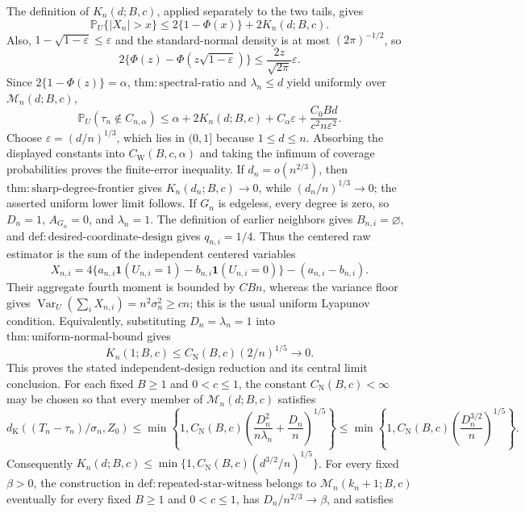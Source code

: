 The definition of \(K_n(d;B,c)\), applied separately to the two tails, gives
\[
 \mathbb P_U\{|X_n|>x\}\le2\{1-\Phi(x)\}+2K_n(d;B,c).
\]
Also, \(1-\sqrt{1-\varepsilon}\le\varepsilon\) and the standard-normal density is at most \((2\pi)^{-1/2}\), so
\[
 2\{\Phi(z)-\Phi(z\sqrt{1-\varepsilon})\}
 \le\frac{2z}{\sqrt{2\pi}}\varepsilon.
\]
Since \(2\{1-\Phi(z)\}=\alpha\), \(\mathrm{thm:spectral\text{-}ratio}\) and \(\lambda_n\le d\) yield uniformly over \(\mathcal M_n(d;B,c)\),
\[
 \mathbb P_U(\tau_n\notin C_{n,\alpha})
 \le\alpha+2K_n(d;B,c)+C_\alpha\varepsilon
 +\frac{C_0Bd}{c^2n\varepsilon^2}.
\]
Choose \(\varepsilon=(d/n)^{1/3}\), which lies in \((0,1]\) because \(1\le d\le n\).  Absorbing the displayed constants into \(C_{\mathrm W}(B,c,\alpha)\) and taking the infimum of coverage probabilities proves the finite-error inequality.  If \(d_n=o(n^{2/3})\), then \(\mathrm{thm:sharp\text{-}degree\text{-}frontier}\) gives \(K_n(d_n;B,c)\to0\), while \((d_n/n)^{1/3}\to0\); the asserted uniform lower limit follows.
If \(G_n\) is edgeless, every degree is zero, so \(D_n=1\), \(A_{G_n}=0\), and \(\lambda_n=1\).  The definition of earlier neighbors gives \(B_{n,i}=\varnothing\), and \(\mathrm{def:desired\text{-}coordinate\text{-}design}\) gives \(q_{n,i}=1/4\).  Thus the centered raw estimator is the sum of the independent centered variables
\[
 X_{n,i}=4\{a_{n,i}\mathbf1(U_{n,i}=1)-b_{n,i}\mathbf1(U_{n,i}=0)\}-(a_{n,i}-b_{n,i}).
\]
Their aggregate fourth moment is bounded by \(CBn\), whereas the variance floor gives \(\operatorname{Var}_U(\sum_iX_{n,i})=n^2\sigma_n^2\ge cn\); this is the usual uniform Lyapunov condition.  Equivalently, substituting \(D_n=\lambda_n=1\) into \(\mathrm{thm:uniform\text{-}normal\text{-}bound}\) gives
\[
 K_n(1;B,c)\le C_{\mathrm N}(B,c)(2/n)^{1/5}\longrightarrow0.
\]
This proves the stated independent-design reduction and its central limit conclusion.
For each fixed \(B\ge1\) and \(0<c\le1\), the constant \(C_{\mathrm N}(B,c)<\infty\) may be chosen so that every member of \(\mathcal M_n(d;B,c)\) satisfies
\[
d_{\mathrm K}((T_n-\tau_n)/\sigma_n,Z_0)\le\min\left\{1,C_{\mathrm N}(B,c)\left(\frac{D_n^2}{n\lambda_n}+\frac{D_n}{n}\right)^{1/5}\right\}\le\min\left\{1,C_{\mathrm N}(B,c)\left(\frac{D_n^{3/2}}n\right)^{1/5}\right\}.
\]
Consequently \(K_n(d;B,c)\le\min\{1,C_{\mathrm N}(B,c)(d^{3/2}/n)^{1/5}\}\).
For every fixed \(\beta>0\), the construction in \(\mathrm{def:repeated\text{-}star\text{-}witness}\) belongs to \(\mathcal M_n(k_n+1;B,c)\) eventually for every fixed \(B\ge1\) and \(0<c\le1\), has \(D_n/n^{2/3}\to\beta\), and satisfies
